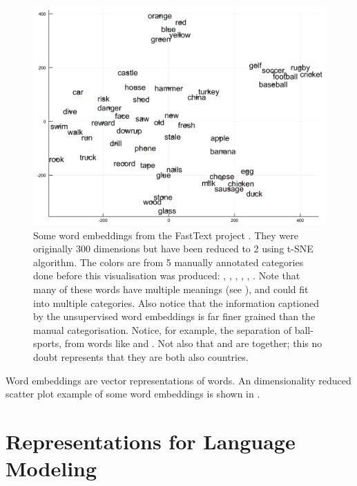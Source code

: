 {\begin{figure}
	
	\caption{Some word embeddings from the FastText project \parencite{bojanowski2016enriching}.
	They were originally 300 dimensions but have been reduced to 2 using t-SNE  algorithm.
	The colors are from 5 manually annotated categories done before this visualisation was produced:
	, , , , , .
	Note that many of these words have multiple meanings (see ), and could fit into multiple categories.
	Also notice that the information captioned by the unsupervised word embeddings is far finer grained than the manual categorisation.
	Notice, for example, the separation of ball-sports, from words like  and .
	Not also that  and  are together; this no doubt represents that they are both also countries.}

	\label{fig:wordvectors}
	\includegraphics[width=\textwidth]{figs/chapterwordrepr/wordembvisual}
\end{figure}


Word embeddings are vector representations of words.
An dimensionality reduced scatter plot example of some word embeddings is shown in  .


\section{Representations for Language Modeling}

}
